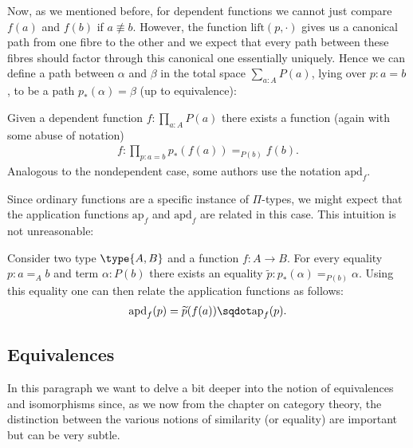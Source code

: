    Now, as we mentioned before, for dependent functions we cannot just compare $f(a)$ and $f(b)$ if $a\not\equiv b$. However, the function $\text{lift}(p, \cdot)$ gives us a canonical path from one fibre to the other and we expect that every path between these fibres should factor through this canonical one essentially uniquely. Hence we can define a path between $\alpha$ and $\beta$ in the total space $\sum_{a:A}P(a)$, lying over $p:a=b$, to be a path $p_*(\alpha)=\beta$ (up to equivalence):
    \begin{property}
        Given a dependent function $f:\prod_{a:A}P(a)$ there exists a function (again with some abuse of notation)
        \begin{gather}
            f:\prod_{p:a=b}p_*(f(a))=_{P(b)}f(b).
        \end{gather}
        Analogous to the nondependent case, some authors use the notation $\text{apd}_f$.
    \end{property}

    Since ordinary functions are a specific instance of $\Pi$-types, we might expect that the application functions $\text{ap}_f$ and $\text{apd}_f$ are related in this case. This intuition is not unreasonable:
    \begin{property}
        Consider two type $\type{A, B}$ and a function $f:A\rightarrow B$. For every equality $p:a=_Ab$ and term $\alpha:P(b)$ there exists an equality $\widetilde{p}:p_*(\alpha)=_{P(b)}\alpha$. Using this equality one can then relate the application functions as follows:
        \begin{gather}
        \text{apd}_f(p) = \widetilde{p}(f(a))\sqdot\text{ap}_f(p).
        \end{gather}
    \end{property}

\subsection{Equivalences}

    In this paragraph we want to delve a bit deeper into the notion of equivalences and isomorphisms since, as we now from the chapter on category theory, the distinction between the various notions of similarity (or equality) are important but can be very subtle.

